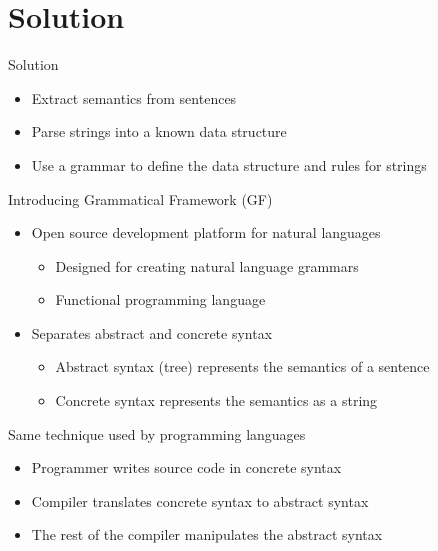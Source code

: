 \section{Solution} 
\begin{frame}{Solution} \pause
  \begin{itemize}
    \item Extract semantics from sentences \pause
    \item Parse strings into a known data structure \pause
    \item Use a grammar to define the data structure and rules for strings
  \end{itemize}
  
\end{frame}

\begin{frame}{Introducing Grammatical Framework (GF)} 
         \begin{itemize}
           \item Open source development platform for natural languages \pause
           \begin{itemize}
              \item Designed for creating natural language grammars\pause
              \item Functional programming language \pause
           \end{itemize}
           \item Separates abstract and concrete syntax \pause
           \begin{itemize}
              \item Abstract syntax (tree) represents the semantics of a sentence \pause
              \item Concrete syntax represents the semantics as a string\pause 
           \end{itemize}\pause
         \end{itemize}
         
           \begin{block}{Same technique used by programming languages}
             \begin{itemize}
               \item Programmer writes source code in concrete syntax \pause
               \item Compiler translates concrete syntax to abstract syntax \pause
               \item The rest of the compiler manipulates the abstract syntax
             \end{itemize}
         \end{block}
         
\end{frame}

